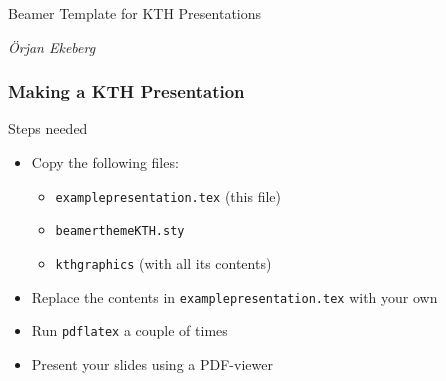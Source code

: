 \documentclass[aspectratio=1610]{beamer}
\begin{document}
\begin{frame}

  \vspace{0.02\textheight}
  
  \begin{Large}
    Beamer Template for KTH Presentations
  \end{Large}

  \vspace{0.1\textheight}

  \begin{small}
    \textit{Örjan Ekeberg}
  \end{small}
\end{frame}




\begin{frame}
  \frametitle{\hfill Making a KTH Presentation}

  \begin{block}{Steps needed}
    \begin{itemize}
    \item Copy the following files:
    \begin{itemize}
    \item \texttt{examplepresentation.tex} (this file)
    \item \texttt{beamerthemeKTH.sty}
    \item \texttt{kthgraphics} (with all its contents)
    \end{itemize}
    \item Replace the contents in \texttt{examplepresentation.tex} with your own
    \item Run \texttt{pdflatex} a couple of times
    \item Present your slides using a PDF-viewer
    \end{itemize}
  \end{block}

\end{frame}
\end{document}
